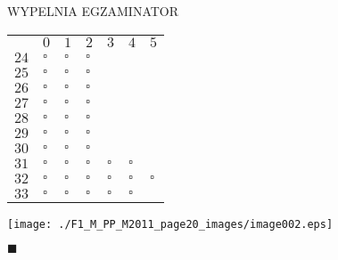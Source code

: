 \documentclass[a4paper,12pt]{article}
\begin{document}
WYPELNIA EGZAMINATOR
\begin{center}
\begin{tabular}{|l|l|l|l|l|l|l|}
	\\
&	\multicolumn{1}{|l|}{$0$}&	\multicolumn{1}{|l|}{ $1$}&	\multicolumn{1}{|l|}{ $2$}&	\multicolumn{1}{|l|}{ $3$}&	\multicolumn{1}{|l|}{ $4$}&	\multicolumn{1}{|l|}{ $5$}	\\
\cline{2-7}
\multicolumn{1}{|l|}{ $24$}&	\multicolumn{1}{|l|}{ $\square $}&	\multicolumn{1}{|l|}{ $\square $}&	\multicolumn{1}{|l|}{ $\square $}&	\multicolumn{1}{|l|}{}&	\multicolumn{1}{|l|}{}&	\multicolumn{1}{|l|}{}	\\
\hline
\multicolumn{1}{|l|}{ $25$}&	\multicolumn{1}{|l|}{ $\square $}&	\multicolumn{1}{|l|}{ $\square $}&	\multicolumn{1}{|l|}{ $\square $}&	\multicolumn{1}{|l|}{}&	\multicolumn{1}{|l|}{}&	\multicolumn{1}{|l|}{}	\\
\hline
\multicolumn{1}{|l|}{ $26$}&	\multicolumn{1}{|l|}{ $\square $}&	\multicolumn{1}{|l|}{ $\square $}&	\multicolumn{1}{|l|}{ $\square $}&	\multicolumn{1}{|l|}{}&	\multicolumn{1}{|l|}{}&	\multicolumn{1}{|l|}{}	\\
\hline
\multicolumn{1}{|l|}{ $27$}&	\multicolumn{1}{|l|}{ $\square $}&	\multicolumn{1}{|l|}{ $\square $}&	\multicolumn{1}{|l|}{ $\square $}&	\multicolumn{1}{|l|}{}&	\multicolumn{1}{|l|}{}&	\multicolumn{1}{|l|}{}	\\
\hline
\multicolumn{1}{|l|}{ $28$}&	\multicolumn{1}{|l|}{ $\square $}&	\multicolumn{1}{|l|}{ $\square $}&	\multicolumn{1}{|l|}{ $\square $}&	\multicolumn{1}{|l|}{}&	\multicolumn{1}{|l|}{}&	\multicolumn{1}{|l|}{}	\\
\hline
\multicolumn{1}{|l|}{ $29$}&	\multicolumn{1}{|l|}{ $\square $}&	\multicolumn{1}{|l|}{ $\square $}&	\multicolumn{1}{|l|}{ $\square $}&	\multicolumn{1}{|l|}{}&	\multicolumn{1}{|l|}{}&	\multicolumn{1}{|l|}{}	\\
\hline
\multicolumn{1}{|l|}{ $30$}&	\multicolumn{1}{|l|}{ $\square $}&	\multicolumn{1}{|l|}{ $\square $}&	\multicolumn{1}{|l|}{ $\square $}&	\multicolumn{1}{|l|}{}&	\multicolumn{1}{|l|}{}&	\multicolumn{1}{|l|}{}	\\
\hline
\multicolumn{1}{|l|}{ $31$}&	\multicolumn{1}{|l|}{ $\square $}&	\multicolumn{1}{|l|}{ $\square $}&	\multicolumn{1}{|l|}{ $\square $}&	\multicolumn{1}{|l|}{ $\square $}&	\multicolumn{1}{|l|}{ $\square $}&	\multicolumn{1}{|l|}{}	\\
\hline
\multicolumn{1}{|l|}{ $32$}&	\multicolumn{1}{|l|}{ $\square $}&	\multicolumn{1}{|l|}{ $\square $}&	\multicolumn{1}{|l|}{ $\square $}&	\multicolumn{1}{|l|}{ $\square $}&	\multicolumn{1}{|l|}{ $\square $}&	\multicolumn{1}{|l|}{ $\square $}	\\
\hline
\multicolumn{1}{|l|}{ $33$}&	\multicolumn{1}{|l|}{ $\square $}&	\multicolumn{1}{|l|}{ $\square $}&	\multicolumn{1}{|l|}{ $\square $}&	\multicolumn{1}{|l|}{ $\square $}&	\multicolumn{1}{|l|}{ $\square $}&	\multicolumn{1}{|l|}{}	\\
\hline
\end{tabular}


\texttt{[image: ./F1\_M\_PP\_M2011\_page20\_images/image002.eps]}
\end{center}
$\blacksquare$
\end{document}
